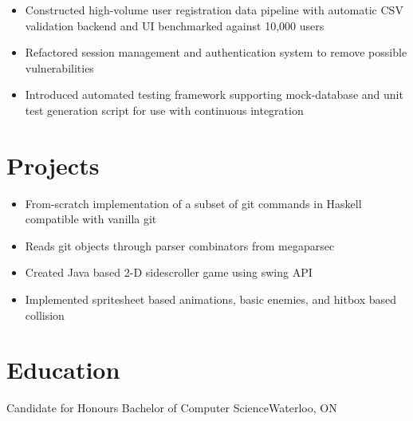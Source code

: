 \documentclass{simple_resume}
\begin{document}
\begin{itemize}
  \item{Constructed high-volume user registration data pipeline with automatic CSV validation backend and UI benchmarked against 10,000 users}
  \item{Refactored session management and authentication system to remove possible vulnerabilities}
  \item{Introduced automated testing framework supporting mock-database and unit test generation script for use with continuous integration}
\end{itemize}

\section{Projects}
\begin{itemize}
  \item From-scratch implementation of a subset of git commands in Haskell
  compatible with vanilla git
  \item Reads git objects through parser combinators from megaparsec
\end{itemize}

\begin{itemize}
  \item{Created Java based 2-D sidescroller game using swing API}
  \item{Implemented spritesheet based animations, basic enemies, and hitbox based collision}
\end{itemize}

\section{Education}
{Candidate for Honours Bachelor of Computer Science}{Waterloo, ON}
\end{document}
